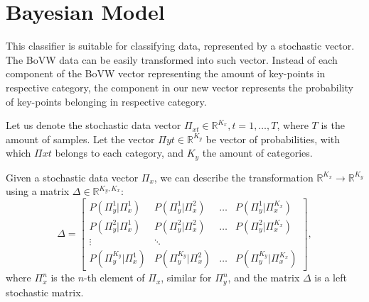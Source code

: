 \section{Bayesian Model}
This classifier is suitable for classifying data, represented by a stochastic vector. The BoVW data can be easily transformed into such vector. Instead of each component of the BoVW vector representing the amount of key-points in respective category, the component in our new vector represents the probability of key-points belonging in respective category.

Let us denote the stochastic data vector $\Pi_{xt} \in \mathbb{R}^{K_x}, t=1,\dots,T$, where $T$ is the amount of samples. Let the vector $\Pi{yt}\in \mathbb{R}^{K_y}$ be vector of probabilities, with which $\Pi{xt}$ belongs to each category, and $K_y$ the amount of categories.

Given a stochastic data vector $\Pi_x$, we can describe the transformation $\mathbb{R}^{K_x} \rightarrow \mathbb{R}^{K_y}$ using a matrix $\Delta \in \mathbb{R}^{K_y, K_x}$:
\begin{equation}
    \Delta =
    \begin{bmatrix}
        P(\Pi_y^1 | \Pi_x^1) & P(\Pi_y^1 | \Pi_x^2) & \dots & P(\Pi_y^1 | \Pi_x^{K_x})\\
        P(\Pi_y^2 | \Pi_x^1) & P(\Pi_y^2 | \Pi_x^2) & \dots & P(\Pi_y^2 | \Pi_x^{K_x})\\
        \vdots & \ddots\\
        P(\Pi_y^{K_y} | \Pi_x^1) & P(\Pi_y^{K_y} | \Pi_x^2) & \dots & P(\Pi_y^{K_y} | \Pi_x^{K_x})
    \end{bmatrix},
\end{equation}
where $\Pi_x^n$ is the $n$-th element of $\Pi_x$, similar for $\Pi_y^n$, and the matrix $\Delta$ is a left stochastic matrix.

